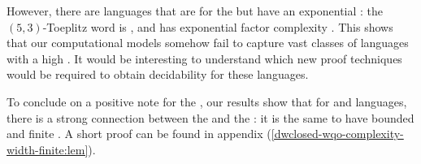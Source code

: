 However, there are  languages that are
 for the  but have an exponential
: the $(5, 3)$-Toeplitz word is 
\cite[p. 499]{CAKA97}, and has exponential factor complexity \cite[Theorem
5]{CAKA97}. This shows that our computational models somehow fail to capture
vast classes of  languages with a high . It would be interesting to understand which new proof techniques
would be required to obtain decidability for these languages.

To conclude on a positive note for the , our results show
that for  and  languages, there is
a strong connection between the  and the : it is the same to have bounded  and finite
. A short proof can be found in appendix 
(\cref{dwclosed-wqo-complexity-width-finite:lem}). 

